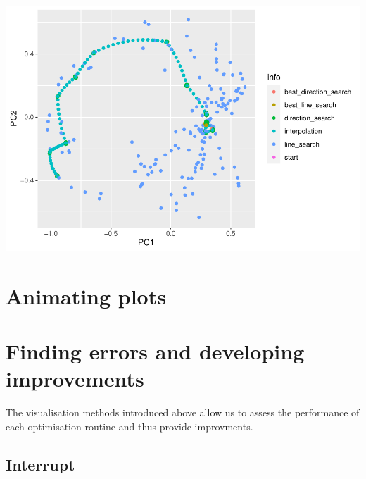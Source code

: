 \documentclass[12pt]{article}
\newenvironment{Shaded}{\begin{snugshade}}{\end{snugshade}}
\newcommand{\DataTypeTok}[1]{\textcolor[rgb]{0.13,0.29,0.53}{#1}}
\newcommand{\KeywordTok}[1]{\textcolor[rgb]{0.13,0.29,0.53}{\textbf{#1}}}
\newcommand{\NormalTok}[1]{#1}
\newcommand{\OperatorTok}[1]{\textcolor[rgb]{0.81,0.36,0.00}{\textbf{#1}}}
\newcommand{\OtherTok}[1]{\textcolor[rgb]{0.56,0.35,0.01}{#1}}
\newcommand{\StringTok}[1]{\textcolor[rgb]{0.31,0.60,0.02}{#1}}
\begin{document}
\includegraphics{paper_files/figure-latex/unnamed-chunk-8-1.pdf}

\hypertarget{animating-plots}{%
\section{Animating plots}\label{animating-plots}}

\begin{Shaded}
\end{Shaded}

\hypertarget{finding-errors-and-developing-improvements}{%
\section{Finding errors and developing
improvements}\label{finding-errors-and-developing-improvements}}

The visualisation methods introduced above allow us to assess the
performance of each optimisation routine and thus provide improvments.

\hypertarget{interrupt}{%
\subsection{Interrupt}\label{interrupt}}
\end{document}
